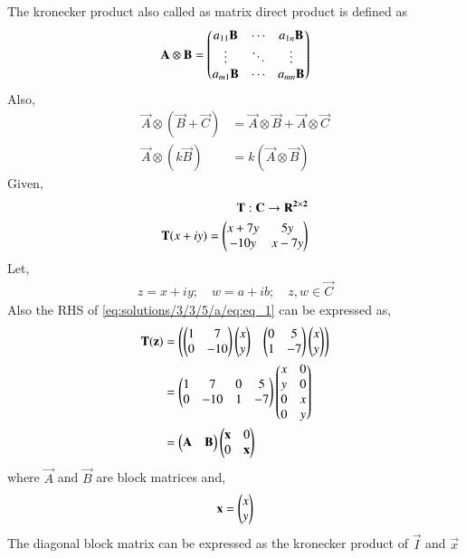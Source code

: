 The kronecker product also called as matrix direct product is defined as \begin{align}
    \mathbf{A} \otimes \mathbf{B} = \begin{pmatrix}a_{11}\mathbf{B} & \cdots & a_{1n}\mathbf{B} \\ \vdots & \ddots & \vdots \\
    a_{m1}\mathbf{B} & \cdots & a_{mn}\mathbf{B}\end{pmatrix} \label{eq:solutions/3/3/5/a/eq:eq_21}
\end{align}
Also,
\begin{align}
    \vec{A} \otimes (\vec{B}+\vec{C}) &=
    \vec{A} \otimes \vec{B} + \vec{A} \otimes \vec{C} \label{eq:solutions/3/3/5/a/eq:eq_22} \\
    \vec{A} \otimes (k\vec{B}) &= 
     k (\vec{A} \otimes \vec{B}) \label{eq:solutions/3/3/5/a/eq:eq_23}
\end{align}
Given,
\begin{align}
    \mathbf{T} : \mathbf{C}\rightarrow \mathbf{R^{2\times2}} \nonumber \\
    \mathbf{T}(x+iy) = \begin{pmatrix}x + 7y & 5y \\ -10y & x-7y\end{pmatrix} \label{eq:solutions/3/3/5/a/eq:eq_1}
\end{align}
Let,
\begin{align}
    z = x+iy; \quad w = a+ib; \quad z,w \in \vec{C} \nonumber
\end{align}
Also the RHS of \eqref{eq:solutions/3/3/5/a/eq:eq_1} can be expressed as,
\begin{align}
    \mathbf{T} (\mathbf{z}) &= \begin{pmatrix}\begin{pmatrix}1 & 7 \\ 0 & -10\end{pmatrix} \begin{pmatrix}x \\ y\end{pmatrix} & \begin{pmatrix}0 & 5 \\ 1 & -7\end{pmatrix} \begin{pmatrix}x \\ y\end{pmatrix}\end{pmatrix} \nonumber \\ 
    &= \begin{pmatrix}1 & 7 & 0 & 5\\ 0 & -10 & 1 & -7\end{pmatrix} \begin{pmatrix}x & 0 \\ y & 0 \\ 0 & x \\ 0 & y\end{pmatrix} \nonumber \\
    &= \begin{pmatrix}\mathbf{A} & \mathbf{B}\end{pmatrix} \begin{pmatrix}\mathbf{x} & 0 \\ 0 & \mathbf{x}\end{pmatrix} \label{eq:solutions/3/3/5/a/eq:eq_2}
\end{align}
where $\vec{A}$ and $\vec{B}$ are block matrices and,
\begin{align}
    \mathbf{x} = \begin{pmatrix}x \\ y\end{pmatrix} \nonumber 
\end{align}
The diagonal block matrix can be expressed as the kronecker product of $\vec{I}$ and $\vec{x}$
